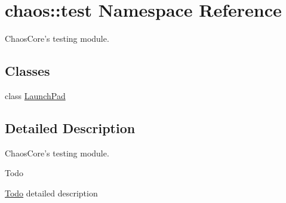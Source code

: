 \hypertarget{namespacechaos_1_1test}{\section{chaos\-:\-:test Namespace Reference}
\label{namespacechaos_1_1test}
}


Chaos\-Core's testing module.  


\subsection*{Classes}
\begin{DoxyCompactItemize}
\item 
class \hyperlink{classchaos_1_1test_1_1_launch_pad}{Launch\-Pad}
\end{DoxyCompactItemize}


\subsection{Detailed Description}
Chaos\-Core's testing module. \begin{DoxyRefDesc}{Todo}
\item[\hyperlink{todo__todo000001}{Todo}]detailed description \end{DoxyRefDesc}
